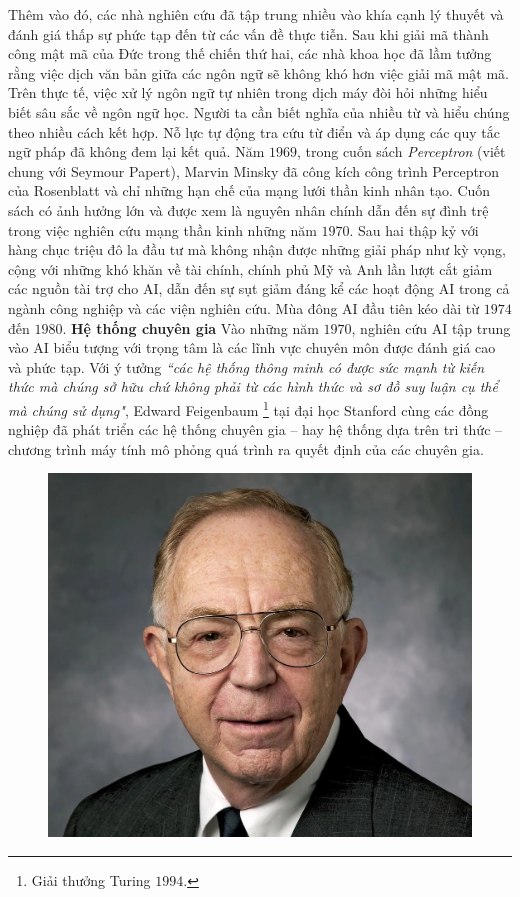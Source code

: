 \begin{multicols}{2}
	\vskip 0.1cm
	Thêm vào đó, các nhà nghiên cứu đã tập trung nhiều vào khía cạnh lý thuyết và đánh giá thấp sự phức tạp đến từ các vấn đề thực tiễn. Sau khi giải mã thành công mật mã của Đức trong thế chiến thứ hai, các nhà khoa học đã lầm tưởng rằng việc dịch văn bản giữa các ngôn ngữ sẽ không khó hơn việc giải mã mật mã. Trên thực tế, việc xử lý ngôn ngữ tự nhiên trong dịch máy đòi hỏi những hiểu biết sâu sắc về ngôn ngữ học. Người ta cần biết nghĩa của nhiều từ và hiểu chúng theo nhiều cách kết hợp. Nỗ lực tự động tra cứu từ điển và áp dụng các quy tắc ngữ pháp đã không đem lại kết quả. 
	\vskip 0.1cm
	Năm $1969$, trong cuốn sách \textit{Perceptron} (viết chung với Seymour Papert), Marvin Minsky đã công kích công trình Perceptron của Rosenblatt và chỉ những hạn chế của mạng lưới thần kinh nhân tạo. Cuốn sách có ảnh hưởng lớn và được xem là nguyên nhân chính dẫn đến sự đình trệ trong việc nghiên cứu mạng thần kinh những năm $1970$.
	\vskip 0.1cm
	Sau hai thập kỷ với hàng chục triệu đô la đầu tư mà không nhận được những giải pháp như kỳ vọng, cộng với những khó khăn về tài chính, chính phủ Mỹ và Anh lần lượt cắt giảm các nguồn tài trợ cho AI, dẫn đến sự sụt giảm đáng kể các hoạt động AI trong cả ngành công nghiệp và các viện nghiên cứu. Mùa đông AI đầu tiên kéo dài từ $1974$ đến $1980$.
	\vskip 0.1cm
	\textbf{\color{cackithi}Hệ thống chuyên gia}
	\vskip 0.1cm
	Vào những năm $1970$, nghiên cứu AI tập trung vào AI biểu tượng với trọng tâm là các lĩnh vực chuyên môn được đánh giá cao và phức tạp. Với ý tưởng \textit{``các hệ thống thông minh có được sức mạnh từ kiến thức mà chúng sở hữu chứ không phải từ các hình thức và sơ đồ suy luận cụ thể mà chúng sử dụng"}, Edward Feigenbaum \footnote{\color{cackithi}Giải thưởng Turing $1994$.} tại đại học Stanford cùng các đồng nghiệp đã phát triển các hệ thống chuyên gia -- hay hệ thống dựa trên tri thức -- chương trình máy tính mô phỏng quá trình ra quyết định của các chuyên gia. 
	\begin{figure}[H]
		\vspace*{-5pt}
		\centering
		\captionsetup{labelformat= empty, justification=centering}
		\includegraphics[width= 1\linewidth]{Edward-Feigenbaum.jpeg}

\end{figure}
\end{multicols}
